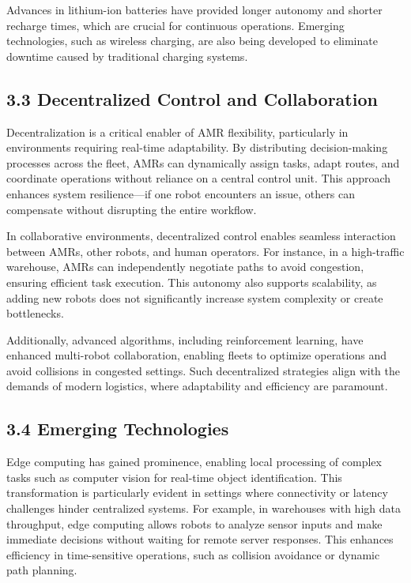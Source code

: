 \documentclass[conference]{IEEEtran}
\begin{document}
Advances in lithium-ion batteries have provided longer autonomy and shorter recharge times, which are crucial for continuous operations. Emerging technologies, such as wireless charging, are also being developed to eliminate downtime caused by traditional charging systems.

\subsection*{\textbf{3.3 Decentralized Control and Collaboration}}
Decentralization is a critical enabler of AMR flexibility, particularly in environments requiring real-time adaptability. By distributing decision-making processes across the fleet, AMRs can dynamically assign tasks, adapt routes, and coordinate operations without reliance on a central control unit. This approach enhances system resilience—if one robot encounters an issue, others can compensate without disrupting the entire workflow.

In collaborative environments, decentralized control enables seamless interaction between AMRs, other robots, and human operators. For instance, in a high-traffic warehouse, AMRs can independently negotiate paths to avoid congestion, ensuring efficient task execution. This autonomy also supports scalability, as adding new robots does not significantly increase system complexity or create bottlenecks.

Additionally, advanced algorithms, including reinforcement learning, have enhanced multi-robot collaboration, enabling fleets to optimize operations and avoid collisions in congested settings. Such decentralized strategies align with the demands of modern logistics, where adaptability and efficiency are paramount.

\subsection*{\textbf{3.4 Emerging Technologies}}
Edge computing has gained prominence, enabling local processing of complex tasks such as computer vision for real-time object identification. This transformation is particularly evident in settings where connectivity or latency challenges hinder centralized systems. For example, in warehouses with high data throughput, edge computing allows robots to analyze sensor inputs and make immediate decisions without waiting for remote server responses. This enhances efficiency in time-sensitive operations, such as collision avoidance or dynamic path planning.
\end{document}

